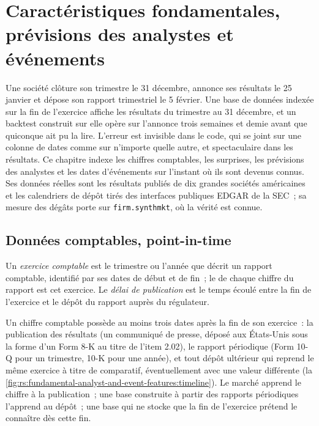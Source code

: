 \chapter{Caractéristiques fondamentales, prévisions des analystes et événements}\label{ch:rs:fundamental-analyst-and-event-features}

Une société clôture son trimestre le 31 décembre, annonce ses résultats le 25 janvier et dépose son rapport trimestriel le 5
février. Une base de données indexée sur la fin de l'exercice affiche les résultats du trimestre au 31 décembre, et un backtest construit sur elle opère
sur l'annonce trois semaines et demie avant que quiconque ait pu la lire. L'erreur est invisible dans le code, qui se joint
sur une colonne de dates comme sur n'importe quelle autre, et spectaculaire dans les résultats. Ce chapitre indexe les chiffres comptables, les surprises, les prévisions des
analystes et les dates d'événements sur l'instant où ils sont devenus connus. Ses données réelles sont les résultats publiés de dix grandes sociétés américaines et
les calendriers de dépôt tirés des interfaces publiques EDGAR de la SEC~; sa mesure des dégâts porte sur \texttt{firm.synthmkt}, où la
vérité est connue.

\section{Données comptables, point-in-time}

\begin{definition}\label{def:rs:fundamental-analyst-and-event-features:fiscal}
Un \emph{exercice comptable} est le trimestre ou l'année que décrit un rapport comptable, identifié par ses dates de début
et de fin~; le  de chaque chiffre du rapport est cet exercice. Le \emph{délai de publication} est le temps écoulé entre
la fin de l'exercice et le dépôt du rapport auprès du régulateur.
\end{definition}

Un chiffre comptable possède au moins trois dates après la fin de son exercice~: la publication des résultats (un communiqué de presse, déposé aux États-Unis sous la
forme d'un Form 8-K au titre de l'item 2.02), le rapport périodique (Form 10-Q pour un trimestre, 10-K pour une année), et tout dépôt ultérieur qui reprend le
même exercice à titre de comparatif, éventuellement avec une valeur différente
(la \cref{fig:rs:fundamental-analyst-and-event-features:timeline}). Le marché apprend le chiffre à la publication~; une base construite à partir des rapports périodiques
l'apprend au dépôt~; une base qui ne stocke que la fin de l'exercice prétend le connaître dès cette fin.

